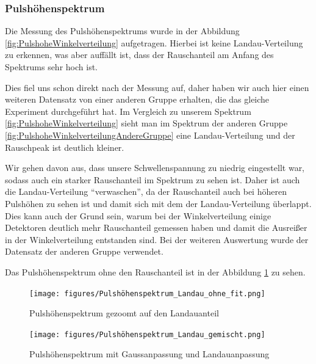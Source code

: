 \documentclass{article}
\begin{document}
\subsubsection*{Pulshöhenspektrum}
Die Messung des Pulshöhenspektrums wurde in der Abbildung \ref{fig:PulshoheWinkelverteilung} aufgetragen.
Hierbei ist keine Landau-Verteilung zu erkennen, was aber auffällt ist, dass der Rauschanteil am Anfang des Spektrums sehr hoch ist.

Dies fiel uns schon direkt nach der Messung auf, daher haben wir auch hier einen weiteren Datensatz von einer anderen Gruppe erhalten, die das gleiche Experiment durchgeführt hat.
Im Vergleich zu unserem Spektrum \ref{fig:PulshoheWinkelverteilung} sieht man im Spektrum der anderen Gruppe \ref{fig:PulshoheWinkelverteilungAndereGruppe} eine Landau-Verteilung und der Rauschpeak
ist deutlich kleiner.

Wir gehen davon aus, dass unsere Schwellenspannung zu niedrig eingestellt war, sodass auch ein starker Rauschanteil im Spektrum zu sehen ist. Daher ist auch die Landau-Verteilung \enquote{verwaschen}, da der Rauschanteil auch
bei höheren Pulshöhen zu sehen ist und damit sich mit dem der Landau-Verteilung überlappt.
Dies kann auch der Grund sein, warum bei der Winkelverteilung einige Detektoren deutlich mehr Rauschanteil gemessen haben und damit die Ausreißer in der Winkelverteilung entstanden sind.
Bei der weiteren Auswertung wurde der Datensatz der anderen Gruppe verwendet.

Das Pulshöhenspektrum ohne den Rauschanteil ist in der Abbildung \ref{fig:PulshoheWinkelverteilungLandauOhneFit} zu sehen.
\begin{figure}
    \centering
    \texttt{[image: figures/Pulshöhenspektrum\_Landau\_ohne\_fit.png]}
    \caption{Pulshöhenspektrum gezoomt auf den Landauanteil}
    \label{fig:PulshoheWinkelverteilungLandauOhneFit}
\end{figure}
\begin{figure}
    \centering
    \texttt{[image: figures/Pulshöhenspektrum\_Landau\_gemischt.png]}
    \caption{Pulshöhenspektrum mit Gaussanpassung und Landauanpassung}
    \label{fig:PulshoheWinkelverteilungmitFit}
\end{figure}
\end{document}
